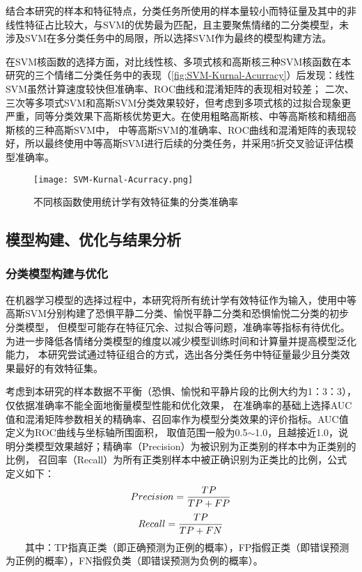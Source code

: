 结合本研究的样本和特征特点，分类任务所使用的样本量较小而特征量及其中的非线性特征占比较大，与SVM的优势最为匹配，且主要聚焦情绪的二分类模型，未涉及SVM在多分类任务中的局限，所以选择SVM作为最终的模型构建方法。

在SVM核函数的选择方面，对比线性核、多项式核和高斯核三种SVM核函数在本研究的三个情绪二分类任务中的表现（\autoref{fig:SVM-Kurnal-Acurracy}）后发现：线性SVM虽然计算速度较快但准确率、ROC曲线和混淆矩阵的表现相对较差；
二次、三次等多项式SVM和高斯SVM分类效果较好，但考虑到多项式核的过拟合现象更严重，同等分类效果下高斯核优势更大。在使用粗略高斯核、中等高斯核和精细高斯核的三种高斯SVM中，
中等高斯SVM的准确率、ROC曲线和混淆矩阵的表现较好，所以最终使用中等高斯SVM进行后续的分类任务，并采用5折交叉验证评估模型准确率。
\vspace{-1ex}
\begin{figure}[htbp]
    \centering
    \texttt{[image: SVM-Kurnal-Acurracy.png]}
    \caption[不同核函数使用统计学有效特征集的分类准确率]{不同核函数使用统计学有效特征集的分类准确率}
    \label{fig:SVM-Kurnal-Acurracy}
\end{figure}

\clearpage
\subsection{模型构建、优化与结果分析}

\subsubsection{分类模型构建与优化}

在机器学习模型的选择过程中，本研究将所有统计学有效特征作为输入，使用中等高斯SVM分别构建了恐惧平静二分类、愉悦平静二分类和恐惧愉悦二分类的初步分类模型，
但模型可能存在特征冗余、过拟合等问题，准确率等指标有待优化。为进一步降低各情绪分类模型的维度以减少模型训练时间和计算量并提高模型泛化能力，
本研究尝试通过特征组合的方式，选出各分类任务中特征量最少且分类效果最好的有效特征集。

考虑到本研究的样本数据不平衡（恐惧、愉悦和平静片段的比例大约为1：3：3），仅依据准确率不能全面地衡量模型性能和优化效果，
在准确率的基础上选择AUC值和混淆矩阵参数相关的精确率、召回率作为模型分类效果的评价指标。AUC值定义为ROC曲线与坐标轴所围面积，
取值范围一般为0.5$ \sim $1.0，且越接近1.0，说明分类模型效果越好；精确率（Precision）为被识别为正类别的样本中为正类别的比例，
召回率（Recall）为所有正类别样本中被正确识别为正类比的比例，公式定义如下：
\vspace{-1ex}
\begin{equation}
    \label{equ:Precision}
    Precision=\frac{TP}{TP+FP}
    \vspace{-4ex}
\end{equation}
\begin{equation}
    \label{equ:Recall}
    Recall=\frac{TP}{TP+FN}
    \vspace{1ex}
\end{equation}
$\qquad$其中：TP指真正类（即正确预测为正例的概率），FP指假正类（即错误预测为正例的概率），FN指假负类（即错误预测为负例的概率）。

